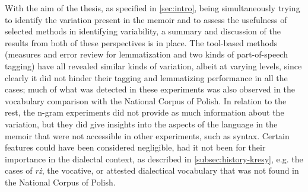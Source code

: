 With the aim of the thesis, as specified in \autoref{sec:intro}, being simultaneously trying to identify the variation present in the memoir and to assess the usefulness of selected methods in identifying variability, a summary and discussion of the results from both of these perspectives is in place. The tool-based methods (measures and error review for lemmatization and two kinds of part-of-speech tagging) have all revealed similar kinds of variation, albeit at varying levels, since clearly it did not hinder their tagging and lemmatizing performance in all the cases; much of what was detected in these experiments was also observed in the vocabulary comparison with the National Corpus of Polish. In relation to the rest, the n-gram experiments did not provide as much information about the variation, but they did give insights into the aspects of the language in the memoir that were not accessible in other experiments, such as syntax. Certain features could have been considered negligible, had it not been for their importance in the dialectal context, as described in \autoref{subsec:history-kresy}, e.g. the cases of \textit{rż}, the vocative, or attested dialectical vocabulary that was not found in the National Corpus of Polish.    

